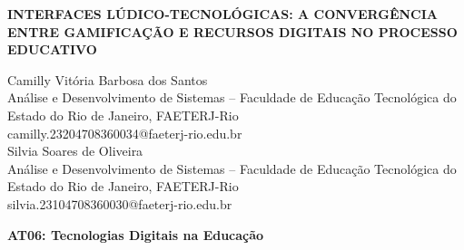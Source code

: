 \documentclass[12pt,a4paper]{article}
\begin{document}
\begin{center}
    {\fontsize{14pt}{16pt}\selectfont \textbf{INTERFACES LÚDICO-TECNOLÓGICAS: 
    A CONVERGÊNCIA ENTRE GAMIFICAÇÃO E RECURSOS DIGITAIS NO PROCESSO EDUCATIVO}}
\end{center}

\vspace{2em}


\noindent
\hfill
\begin{minipage}[t]{0.90\textwidth}
\raggedleft
Camilly Vitória Barbosa dos Santos \\
Análise e Desenvolvimento de Sistemas – Faculdade de Educação Tecnológica do Estado do Rio de Janeiro, FAETERJ-Rio \\
camilly.23204708360034@faeterj-rio.edu.br \\[1em]

Silvia Soares de Oliveira \\
Análise e Desenvolvimento de Sistemas – Faculdade de Educação Tecnológica do Estado do Rio de Janeiro, FAETERJ-Rio \\
silvia.23104708360030@faeterj-rio.edu.br
\end{minipage}

\vspace{2em}

\noindent
\begin{minipage}[t]{0.48\textwidth}
\raggedright
\textbf{AT06: Tecnologias Digitais na Educação}
\end{minipage}

\vspace{1em}
\end{document}
